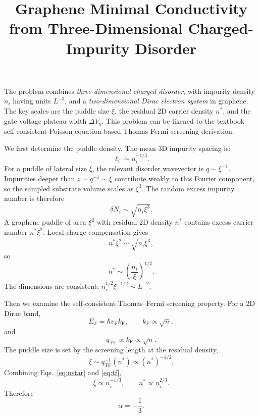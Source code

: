 \documentclass[11pt]{article}
\title{\vspace{-1.2cm}Graphene Minimal Conductivity from Three-Dimensional Charged-Impurity Disorder}
\author{}
\date{}
\newcommand{\kF}{k_{\mathrm F}}
\newcommand{\qTF}{q_{\mathrm{TF}}}
\begin{document}
\maketitle
\vspace{-0.9cm}

The problem combines \emph{three-dimensional charged disorder}, with impurity density
$n_i$ having units $L^{-3}$, and a \emph{two-dimensional Dirac electron system} in graphene.
The key scales are the puddle size $\xi$, the residual 2D carrier density $n^*$, and the gate-voltage plateau width $\Delta V_g$. This problem can be likened to the textbook self-consistent Poisson equation-based Thomas-Fermi screening derivation.

We first determine the puddle density. The mean 3D impurity spacing is:
\begin{equation}
    \ell_i\sim n_i^{-1/3}.
\end{equation}
For a puddle of lateral size $\xi$, the relevant disorder wavevector is $q\sim\xi^{-1}$.
Impurities deeper than $z\sim q^{-1}\sim\xi$ contribute weakly to this Fourier component, so the sampled substrate volume scales as $\xi^3$. The random excess impurity number is therefore
\begin{equation}
    \delta N_i\sim\sqrt{n_i\xi^3}.
\end{equation}
A graphene puddle of area $\xi^2$ with residual 2D density $n^*$ contains excess carrier number $n^*\xi^2$. Local charge compensation gives
\begin{equation}
    n^*\xi^2\sim\sqrt{n_i\xi^3},
\end{equation}
so
\begin{equation}
    \boxed{n^*\sim\left(\frac{n_i}{\xi}\right)^{1/2}}.
    \label{eq:nstar}
\end{equation}
The dimensions are consistent: $n_i^{1/2}\xi^{-1/2}\sim L^{-2}$.

Then we examine the self-consistent Thomas--Fermi screening property. For a 2D Dirac band,
\begin{equation}
    E_F=\hbar v_F\kF,
    \qquad
    \kF\propto\sqrt{n},
\end{equation}
and
\begin{equation}
    \qTF\propto\kF\propto\sqrt{n}.
\end{equation}
The puddle size is set by the screening length at the residual density,
\begin{equation}
    \xi\sim \qTF^{-1}(n^*)\propto(n^*)^{-1/2}.
    \label{eq:tf}
\end{equation}
Combining Eqs.~\eqref{eq:nstar} and \eqref{eq:tf},
\begin{equation}
    \boxed{\xi\propto n_i^{-1/3}},
    \qquad
    \boxed{n^*\propto n_i^{2/3}}.
\end{equation}
Therefore
\begin{equation}
    \boxed{\alpha=-\frac13}.
\end{equation}
\end{document}
